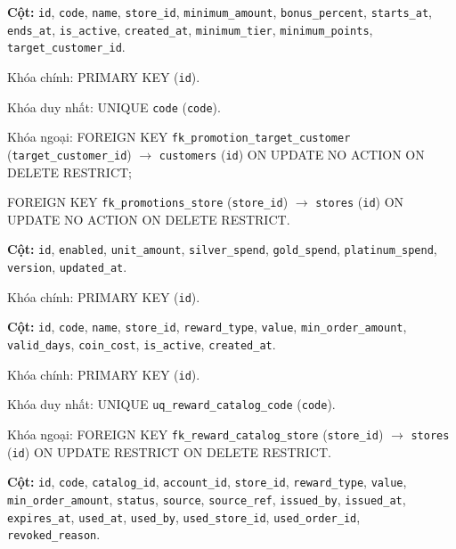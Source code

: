 \begin{description}[leftmargin=3.6cm,labelwidth=3.4cm,style=nextline]

\item[\texttt{promotions}] \textbf{Cột:} \texttt{id}, \texttt{code}, \texttt{name}, \texttt{store\_id}, \texttt{minimum\_amount}, \texttt{bonus\_percent}, \texttt{starts\_at}, \texttt{ends\_at}, \texttt{is\_active}, \texttt{created\_at}, \texttt{minimum\_tier}, \texttt{minimum\_points}, \texttt{target\_customer\_id}.

Khóa chính: PRIMARY KEY (\texttt{id}).

Khóa duy nhất: UNIQUE \texttt{code} (\texttt{code}).

Khóa ngoại: FOREIGN KEY \texttt{fk\_promotion\_target\_customer} (\texttt{target\_customer\_id}) $\rightarrow$ \texttt{customers} (\texttt{id}) ON UPDATE NO ACTION ON DELETE RESTRICT;\par FOREIGN KEY \texttt{fk\_promotions\_store} (\texttt{store\_id}) $\rightarrow$ \texttt{stores} (\texttt{id}) ON UPDATE NO ACTION ON DELETE RESTRICT.

\item[\texttt{loyalty\_settings}] \textbf{Cột:} \texttt{id}, \texttt{enabled}, \texttt{unit\_amount}, \texttt{silver\_spend}, \texttt{gold\_spend}, \texttt{platinum\_spend}, \texttt{version}, \texttt{updated\_at}.

Khóa chính: PRIMARY KEY (\texttt{id}).

\item[\texttt{reward\_catalog}] \textbf{Cột:} \texttt{id}, \texttt{code}, \texttt{name}, \texttt{store\_id}, \texttt{reward\_type}, \texttt{value}, \texttt{min\_order\_amount}, \texttt{valid\_days}, \texttt{coin\_cost}, \texttt{is\_active}, \texttt{created\_at}.

Khóa chính: PRIMARY KEY (\texttt{id}).

Khóa duy nhất: UNIQUE \texttt{uq\_reward\_catalog\_code} (\texttt{code}).

Khóa ngoại: FOREIGN KEY \texttt{fk\_reward\_catalog\_store} (\texttt{store\_id}) $\rightarrow$ \texttt{stores} (\texttt{id}) ON UPDATE RESTRICT ON DELETE RESTRICT.

\item[\texttt{customer\_vouchers}] \textbf{Cột:} \texttt{id}, \texttt{code}, \texttt{catalog\_id}, \texttt{account\_id}, \texttt{store\_id}, \texttt{reward\_type}, \texttt{value}, \texttt{min\_order\_amount}, \texttt{status}, \texttt{source}, \texttt{source\_ref}, \texttt{issued\_by}, \texttt{issued\_at}, \texttt{expires\_at}, \texttt{used\_at}, \texttt{used\_by}, \texttt{used\_store\_id}, \texttt{used\_order\_id}, \texttt{revoked\_reason}.


\end{description}

